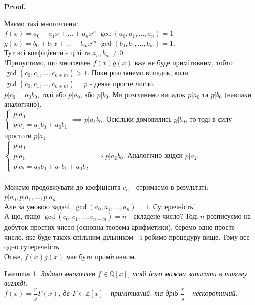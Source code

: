 \documentclass[a4paper, 10pt]{article}
\makeatletter
\theoremstyle{theoremdd}
\theoremstyle{theoremdd}
\theoremstyle{theoremdd}
\theoremstyle{theoremdd}
\theoremstyle{theoremdd}
\theoremstyle{theoremdd}
\theoremstyle{theoremdd}
\newtheorem{lemma}[theorem]{Lemma}
\theoremstyle{theoremdd}
\renewenvironment{proof}[1][Proof.\\]{\par
\pushQED{\hfill \qed}%
\normalfont \topsep6\p@\@plus6\p@\relax
\trivlist
\item\relax
{\bfseries
#1\@addpunct{.}}\hspace\labelsep\ignorespaces
}{%
\popQED\endtrivlist\@endpefalse
}
\makeatother
\begin{document}
\begin{proof}
Маємо такі многочлени:\\
$f(x) = a_0 + a_1x + \dots + a_nx^n$ \hspace{1cm} $\gcd(a_0,a_1,\dots,a_n) = 1$ \\
$g(x) = b_0 + b_1x + \dots + b_mx^m$ \hspace{1cm} $\gcd(b_0,b_1,\dots,b_m) = 1$.\\
Тут всі коефіцієнти - цілі та $a_n, b_m \neq 0$.\\
!Припустимо, що многочлен $f(x)g(x)$ вже не буде примітивним, тобто $\gcd(c_0,c_1,\dots,c_{n+m}) > 1$. Поки розглянемо випадок, коли $\gcd(c_0,c_1,\dots,c_{n+m}) = p$ - деяке просте число.\\
$p | c_0 = a_0b_0$, тоді або $p | a_0$, або $p | b_0$. Ми розглянемо випадок $p | a_0$ та $p \not| b_0$ (навпаки аналогічно).\\
$\begin{cases} p | a_0 \\ p | c_1 = a_1b_0+a_0b_1 \end{cases} \implies p | a_1b_0$. Оскільки домовились $p \not| b_0$, то тоді в силу простоти $p | a_1$.\\
$\begin{cases}
p | a_0 \\
p | a_1 \\
p | c_2 = a_2b_0 + a_1b_1 + a_0b_2
\end{cases} \implies p | a_2b_0
$. Аналогічно звідси $p | a_2$.\\
$\vdots$\\
Можемо продовжувати до коефіцієнта $c_n$ - отримаємо в результаті:\\
$p | a_0, p | a_1, \dots, p | a_n$.\\
Але за умовою задачі, $\gcd(a_0,a_1,\dots,a_n) = 1$. Суперечність!
\bigskip \\
А що, якщо $\gcd(c_0,c_1,\dots,c_{n+m}) = n$ - складене число? Тоді $n$ розписуємо на добуток простих чисел (основна теорема арифметики), беремо одне просте число, яке буде також спільним дільником - і робимо процедуру вище. Тому все одно суперечність.\\
Отже, $f(x)g(x)$ має бути примітивним.
\end{proof}

\begin{lemma}
Задано многочлен $f \in \mathbb{Q}[x]$, тоді його можна записати в такому вигляді:\\
$f(x) = \dfrac{r}{s} F(x)$, де $F \in \mathbb{Z}[x]$ - примітивний, та дріб $\dfrac{r}{s}$ - нескоротимий.
\end{lemma}
\end{document}
